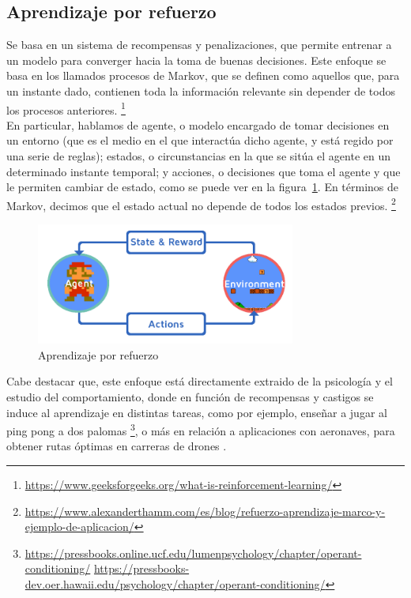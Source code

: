 \subsection{Aprendizaje por refuerzo}
\label{subsec:aprendizaje_por_refuerzo}

Se basa en un sistema de recompensas y penalizaciones, que permite entrenar a un modelo para converger hacia la toma de buenas decisiones. Este enfoque se basa en los llamados procesos de Markov, que se definen como aquellos que, para un instante dado, contienen toda la información relevante sin depender de todos los procesos anteriores. \footnote[17]{\url{https://www.geeksforgeeks.org/what-is-reinforcement-learning/}}\\

En particular, hablamos de agente, o modelo encargado de tomar decisiones en un entorno (que es el medio en el que interactúa dicho agente, y está regido por una serie de reglas); estados, o circunstancias en la que se sitúa el agente en un determinado instante temporal; y acciones, o decisiones que toma el agente y que le permiten cambiar de estado, como se puede ver en la figura~\ref{fig:reinforcement_learning}. En términos de Markov, decimos que el estado actual no depende de todos los estados previos. \footnote[18]{\url{https://www.alexanderthamm.com/es/blog/refuerzo-aprendizaje-marco-y-ejemplo-de-aplicacion/}}\\

\begin{figure} [tp]
	\begin{center}
	\includegraphics[height=4cm]{imagenes/cap1/9_reinforcement.png}
	\end{center}
	\caption[Aprendizaje por refuerzo]{Aprendizaje por refuerzo}
	\label{fig:reinforcement_learning}
\end{figure}

Cabe destacar que, este enfoque está directamente extraido de la psicología y el estudio del comportamiento, donde en función de recompensas y castigos se induce al aprendizaje en distintas tareas, como por ejemplo, enseñar a jugar al ping pong a dos palomas \footnote[19]{\url{https://pressbooks.online.ucf.edu/lumenpsychology/chapter/operant-conditioning/} \url{https://pressbooks-dev.oer.hawaii.edu/psychology/chapter/operant-conditioning/}}, o más en relación a aplicaciones con aeronaves, para obtener rutas óptimas en carreras de drones \cite{9636053}.\\

